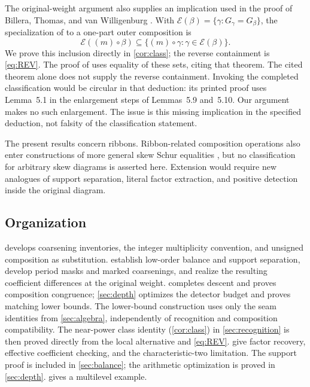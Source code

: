 \documentclass[11pt,a4paper]{amsart}
\numberwithin{equation}{section}
\theoremstyle{plain}
\theoremstyle{definition}
\newcommand{\Ec}{\mathcal E}
\begin{document}
The original-weight argument also supplies an implication used in the proof
of Billera, Thomas, and van Willigenburg \cite{Billera2006DecomposableCompositions}.
With \(\Ec(\beta)=\{\gamma:G_\gamma=G_\beta\}\), the specialization of
\cite[Theorem~4.5]{Billera2006DecomposableCompositions} to a
one-part outer composition is
\begin{equation}\label{eq:old-inclusion}
\Ec((m)\circ\beta)
\subseteq\{(m)\circ\gamma:\gamma\in\Ec(\beta)\}.
\end{equation}
We prove this inclusion directly in \cref{cor:class}; the reverse
containment is \eqref{eq:REV}.
The proof of \cite[Lemma~5.1]{Billera2006DecomposableCompositions} uses equality of these sets,
citing that theorem.  The cited theorem alone does not supply the reverse
containment.  Invoking the completed classification would be circular in
that deduction: its printed proof uses Lemma~5.1 in the enlargement steps
of Lemmas~5.9 and~5.10.  Our argument makes no such
enlargement.  The issue is this missing implication in the specified
deduction, not falsity of the classification statement.

The present results concern ribbons.  Ribbon-related composition operations
also enter constructions of more general skew Schur equalities
\cite{McNamara2009Classification,Reiner2007Coincidences}, but no classification for arbitrary skew diagrams is asserted
here.  Extension would require new analogues of support separation,
literal factor extraction, and positive detection inside the original diagram.

\subsection{Organization}
 develops coarsening inventories, the integer multiplicity
convention, and unsigned composition as substitution.
 establish low-order balance
and support separation, develop period masks and marked coarsenings, and
realize the resulting coefficient differences at the original weight.
 completes descent and proves composition congruence;
\cref{sec:depth} optimizes the detector budget and proves matching lower bounds.
The lower-bound construction uses only the seam identities from
\cref{sec:algebra}, independently of recognition and composition compatibility.
The near-power class identity (\cref{cor:class}) in \cref{sec:recognition}
is then proved directly from the local alternative and \eqref{eq:REV}.
 give factor recovery, effective coefficient
checking, and the characteristic-two limitation.
The support proof is included in \cref{sec:balance}; the arithmetic
optimization is proved in \cref{sec:depth}.
 gives a multilevel example.
\end{document}
